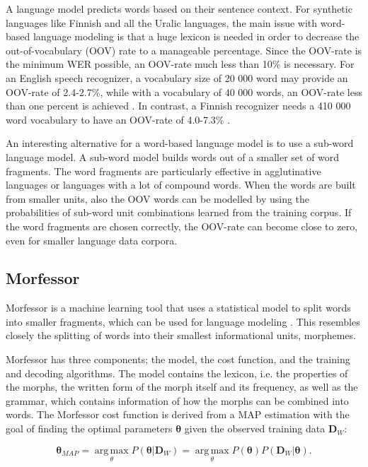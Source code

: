 \documentclass[b5paper]{article}
\newcommand{\ngram}{$n$-gram}
\begin{document}

A language model predicts words based on their sentence context. For synthetic languages like Finnish and all the Uralic languages, the main issue with word-based language modeling is that a huge lexicon is needed in order to decrease the out-of-vocabulary (OOV) rate to a manageable percentage. Since the OOV-rate is the minimum WER possible, an OOV-rate much less than 10\% is necessary. For an English speech recognizer, a vocabulary size of 20 000 word may provide an OOV-rate of 2.4-2.7\%, while with a vocabulary of 40 000 words, an OOV-rate less than one percent is achieved \cite{woodland19951994}. In contrast, a Finnish recognizer needs a 410 000 word vocabulary to have an OOV-rate of 4.0-7.3\% \cite{hirsimaki2006unlimited}.

An interesting alternative for a word-based language model is to use a sub-word language model. A sub-word model builds words out of a smaller set of word fragments. The word fragments are particularly effective in agglutinative languages or languages with a lot of compound words. When the words are built from smaller units, also the OOV words can be modelled by using the probabilities of sub-word unit combinations learned from the training corpus. If the word fragments are chosen correctly, the OOV-rate can become close to zero, even for smaller language data corpora.

\subsection{Morfessor}
Morfessor is a machine learning tool that uses a statistical model to split words into smaller fragments, which can be used for language modeling \cite{creutz2007unsupervised}. This resembles closely the splitting of words into their smallest informational units, morphemes. 

Morfessor has three components; the model, the cost function, and the training and decoding algorithms. The model contains the lexicon, i.e. the properties of the morphs, the written form of the morph itself and its frequency, as well as the grammar, which contains information of how the morphs can be combined into words. The Morfessor cost function is derived from a MAP estimation with the goal of finding the optimal parameters $\bm{\theta}$ given the observed training data $\bm{D}_W$:

\begin{equation}
\bm{\theta}_{MAP}=\operatorname*{arg\,max}_{\theta}P(\bm{\theta}|\bm{D}_W)=\operatorname*{arg\,max}_{\theta}P(\bm{\theta})P(\bm{D}_W|\bm{\theta}).
\end{equation}
\end{document}
